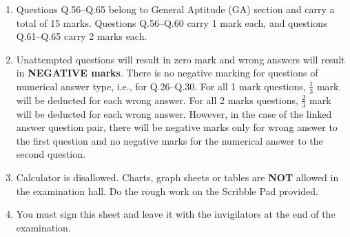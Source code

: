 \documentclass[journal]{IEEEtran}
\begin{document}
\begin{enumerate}[leftmargin=0pt]
    \item Questions Q.56–Q.65 belong to General Aptitude (GA) section and carry a total of 15 marks. Questions Q.56–Q.60 carry 1 mark each, and questions Q.61–Q.65 carry 2 marks each.
    
    \item Unattempted questions will result in zero mark and wrong answers will result in \textbf{NEGATIVE marks}. There is no negative marking for questions of numerical answer type, i.e., for Q.26–Q.30. For all 1 mark questions, $\tfrac{1}{3}$ mark will be deducted for each wrong answer. For all 2 marks questions, $\tfrac{2}{3}$ mark will be deducted for each wrong answer. However, in the case of the linked answer question pair, there will be negative marks only for wrong answer to the first question and no negative marks for the numerical answer to the second question.
    
    \item Calculator is disallowed. Charts, graph sheets or tables are \textbf{NOT} allowed in the examination hall. Do the rough work on the Scribble Pad provided.
    
    \item You must sign this sheet and leave it with the invigilators at the end of the examination.

\end{enumerate}
\end{document}
